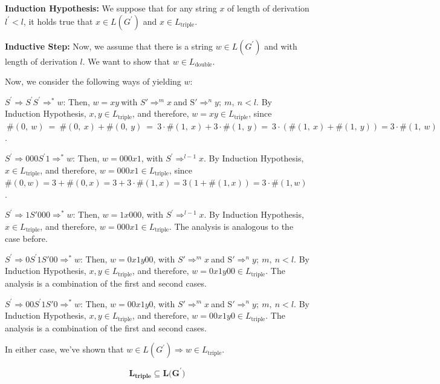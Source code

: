 \documentclass[12pt]{article}
\begin{document}
\textbf{Induction Hypothesis:} We suppose that for any string \(x\) of length of
derivation \(l^{'} < l\), it holds true that \(x \in L(G^{'})\) and
\(x \in L_{\text{triple}}\).

\textbf{Inductive Step:} Now, we assume that there is a string \(w \in L(G^{'})\)
and with length of derivation \(l\). We want to show that
\(w \in L_{\text{double}}\).

Now, we consider the following ways of yielding \(w\):

\(S^{'} \Rightarrow S^{'}S^{'} \Rightarrow^{*}w\): Then,
\(w = xy\ \)with
\(S' \Rightarrow^{m}x\ \)and\(\text{\ S}' \Rightarrow^{n}y;\ m,\ n < l\text{.\ }\)By
Induction Hypothesis, \(x,y \in L_{\text{triple}}\), and therefore,
\(w = xy \in L_{\text{triple}}\),
since\(\ \#(0,\ w)\  = \ \#(0,\ x) + \#(0,\ y)\  = \ 3 \cdot \#(1,\ x) + 3 \cdot \#(1,\ y) = \ 3 \cdot \left( \#(1,\ x) + \#(1,\ y) \right) = 3 \cdot \#(1,\ w)\).

\(S^{'} \Rightarrow 000S^{'}1 \Rightarrow^{*}w\): Then, \(w = 000x1\),
with \(S^{'} \Rightarrow^{l - 1}x\). By Induction Hypothesis,
\(x \in L_{\text{triple}}\), and therefore,
\(w = 000x1 \in L_{\text{triple}}\), since
\(\#(0,w) = 3 + \#(0,x) = 3 + 3 \cdot \#(1,x) = 3\left( 1 + \#(1,x) \right) = 3 \cdot \#(1,w)\).

\(S^{'} \Rightarrow 1S'000 \Rightarrow^{*}w\): Then, \(w = 1x000\), with
\(S^{'} \Rightarrow^{l - 1}x\). By Induction Hypothesis,
\(x \in L_{\text{triple}}\), and therefore,
\(w = 000x1 \in L_{\text{triple}}\). The analysis is analogous to the
case before.

\(S^{'} \Rightarrow 0S^{'}1S'00 \Rightarrow^{*}w\): Then,
\(w = 0x1y00\), with
\(S' \Rightarrow^{m}x\ \)and\(\text{\ S}' \Rightarrow^{n}y;\ m,\ n < l\).
By Induction Hypothesis, \(x,y \in L_{\text{triple}}\), and therefore,
\(w = 0x1y00 \in L_{\text{triple}}\). The analysis is a combination of
the first and second cases.

\(S^{'} \Rightarrow 00S^{'}1S'0 \Rightarrow^{*}w\): Then,
\(w = 00x1y0\), with
\(S' \Rightarrow^{m}x\ \)and\(\text{\ S}' \Rightarrow^{n}y;\ m,\ n < l.\)
By Induction Hypothesis, \(x,y \in L_{\text{triple}}\), and therefore,
\(w = 00x1y0 \in L_{\text{triple}}\). The analysis is a combination of
the first and second cases.

In either case, we've shown that
\(w \in L\left( G^{'} \right) \Rightarrow w \in L_{\text{triple}}.\)

\[\mathbf{L}_{\mathbf{\text{triple}}}\mathbf{\subseteq}\mathbf{L(}\mathbf{G}^{\mathbf{'}}\mathbf{)}\]
\end{document}
